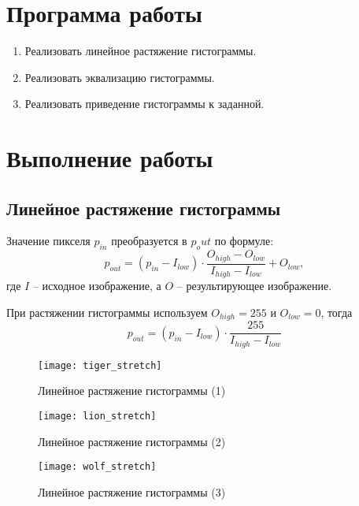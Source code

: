 





\tableofcontents
\newpage

\section{Программа работы}

\begin{enumerate}
	\item Реализовать линейное растяжение гистограммы.
	\item Реализовать эквализацию гистограммы.
	\item Реализовать приведение гистограммы к заданной.
\end{enumerate}

\section{Выполнение работы}

\subsection{Линейное растяжение гистограммы}

Значение пикселя $p_{in}$ преобразуется в $p_out$ по формуле:
$$
p_{out} = (p_{in} - I_{low}) \cdot \frac{O_{high} - O_{low}}{I_{high} - I_{low}} + O_{low},
$$
где $I$ -- исходное изображение, а $O$ -- результирующее изображение.

При растяжении гистограммы используем $O_{high} = 255$ и $O_{low} = 0$, тогда
$$
p_{out} = (p_{in} - I_{low}) \cdot \frac{255}{I_{high} - I_{low}}
$$

\begin{figure}[H]
	\centering
	\texttt{[image: tiger\_stretch]}
	\caption{Линейное растяжение гистограммы (1)}
\end{figure}

\begin{figure}[H]
	\centering
	\texttt{[image: lion\_stretch]}
	\caption{Линейное растяжение гистограммы (2)}
\end{figure}

\begin{figure}[H]
	\centering
	\texttt{[image: wolf\_stretch]}
	\caption{Линейное растяжение гистограммы (3)}
\end{figure}

